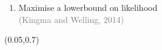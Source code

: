 {\begin{textblock*}{\textwidth}
\begin{enumerate}
		\item<6-> Maximise a lowerbound on likelihood\\
		\textcolor{gray}{(Kingma and Welling, 2014)}
	\end{enumerate}		
	\end{textblock*}
	
	\begin{textblock*}{\textwidth}(0.05\textwidth,0.7\textheight)
\end{textblock*}}
